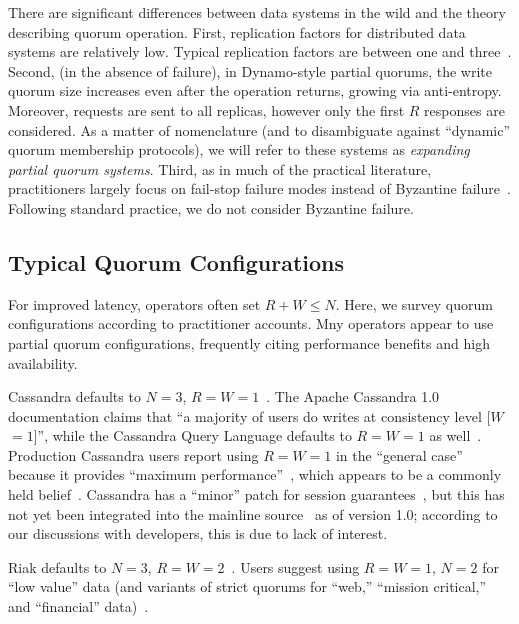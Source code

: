 \documentclass{vldb}
\newcommand{\subsectionskip}{-0em}
\begin{document}
There are significant differences between data systems in the wild and
the theory describing quorum operation.  First, replication factors
for distributed data systems are relatively low.  Typical replication
factors are between one and three~\cite{cassandradefault, feinbergpc,
  codapc}.  Second, (in the absence of failure), in Dynamo-style
partial quorums, the write quorum size increases even after the
operation returns, growing via anti-entropy.  Moreover, requests
are sent to all replicas, however only the first $R$ responses are
considered.  As a matter of nomenclature (and to disambiguate against
``dynamic'' quorum membership protocols), we will refer to these systems
as \textit{expanding partial quorum systems}.  Third, as in much of
the practical literature, practitioners largely focus on fail-stop
failure modes instead of Byzantine failure~\cite{birman-byzantine}.
Following standard practice, we do not consider Byzantine failure.

\vspace{\subsectionskip}\subsection{Typical Quorum Configurations}

For improved latency, operators often set $R+W \leq N$.  Here, we
survey quorum configurations according to practitioner accounts.  Mny
operators appear to use partial quorum configurations, frequently
citing performance benefits and high availability.

Cassandra defaults to $N$$=$$3$,
$R$$=$$W$$=$$1$~\cite{cassandradefault}. The Apache Cassandra 1.0
documentation claims that ``a majority of users do writes at
consistency level [$W$$=$$1$]'', while the Cassandra Query Language
defaults to $R$$=$$W$$=$$1$ as well~\cite{cassandra-docs}.  Production
Cassandra users report using $R$$=$$W$$=$$1$ in the ``general case''
because it provides ``maximum performance''~\cite{maxperfblog}, which
appears to be a commonly held belief~\cite{reddit, outbrain}.
Cassandra has a ``minor'' patch for session
guarantees~\cite{sessionguarantees}, but this has not yet been
integrated into the mainline source~\cite{cassandra-session} as of
version 1.0; according to our discussions with developers, this is due
to lack of interest.

Riak defaults to $N$$=$$3$, $R$$=$$W$$=$$2$~\cite{riakdefault-n,
  riakdefault-rw}. Users suggest using $R$$=$$W$$=$$1$, $N$$=$$2$ for
``low value'' data (and variants of strict quorums for ``web,''
``mission critical,'' and ``financial'' data)~\cite{riaktalkone,
  riaktalktwo}.
\end{document}
